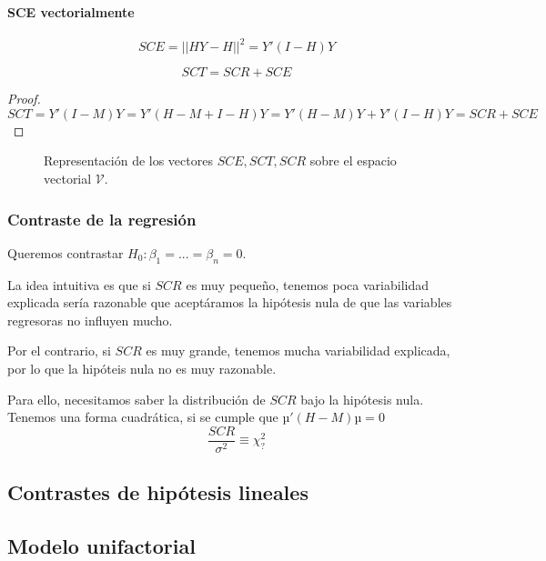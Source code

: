 \paragraph{SCE vectorialmente}
\[SCE = ||HY-H||^2 = Y'(I-H)Y\]

\begin{prop}
\[SCT = SCR + SCE\]
\end{prop}

\begin{proof}
\[SCT = Y'(I-M)Y = Y'(H-M+I-H)Y = Y'(H-M)Y + Y'(I-H)Y = SCR + SCE\]
\end{proof}

\begin{figure}[hbtp]
	\centering
	\caption{Representación de los vectores $SCE,SCT,SCR$ sobre el espacio vectorial $\mathcal{V}$.}
\end{figure}

\subsubsection{Contraste de la regresión}
Queremos contrastar $H_0 : β_1 = ... = β_n = 0$.

La idea intuitiva es que si $SCR$ es muy pequeño, tenemos poca variabilidad explicada sería razonable que aceptáramos la hipótesis nula de que las variables regresoras no influyen mucho.

Por el contrario, si $SCR$ es muy grande, tenemos mucha variabilidad explicada, por lo que la hipóteis nula no es muy razonable.


Para ello, necesitamos saber la distribución de $SCR$ bajo la hipótesis nula. Tenemos una forma cuadrática, si se cumple que $µ'(H-M)µ = 0$
\[
\frac{SCR}{σ^2} \equiv \chi^2_{?}
\]

\subsection{Contrastes de hipótesis lineales}
\subsection{Modelo unifactorial}

